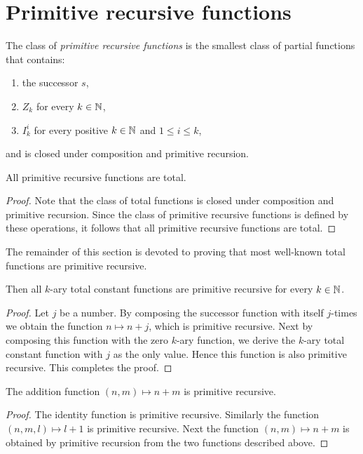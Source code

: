 \documentclass[10pt]{amsart}
\begin{document}
\section{Primitive recursive functions}

\begin{definition}
	The class of \textit{primitive recursive functions} is the smallest class of partial functions that contains:
	\begin{enumerate}[label=\textbf{(\arabic*)}, leftmargin=3.0em]
		\item the successor $s$,
		\item $Z_k$ for every $k \in {\mathbb N}$,
		\item $I^i_k$ for every positive $k \in {\mathbb N}$ and $1\leq i \leq k$,
	\end{enumerate}
	and is closed under composition and primitive recursion.
\end{definition}

\begin{proposition}\label{proposition:all_primitive_recursive_functions_are_total}
	All primitive recursive functions are total.
\end{proposition}
\begin{proof}
	Note that the class of total functions is closed under composition and primitive recursion. Since the class of primitive recursive functions  is defined by these operations, it follows that all primitive recursive functions  are total.
\end{proof}
\noindent
The remainder of this section is devoted to proving that most well-known total functions are primitive recursive.

\begin{proposition}\label{proposition:all_constant_functions_are_primitive_recursive}
	Then all $k$-ary total constant functions are primitive recursive  for every $k \in {\mathbb N}$.
\end{proposition}
\begin{proof}
	Let $j$ be a number. By composing the successor function with itself $j$-times we obtain the function $n \mapsto n + j$, which is primitive recursive. Next by composing this function with the zero $k$-ary function, we derive the $k$-ary total constant function with $j$ as the only value. Hence this function is also primitive recursive. This completes the proof.
\end{proof}

\begin{proposition}\label{proposition:addition_is_primitive_recursive}
	The addition function $(n,m) \mapsto n + m$ is primitive recursive.
\end{proposition}
\begin{proof}
	The identity function is primitive recursive. Similarly the function $(n,m,l) \mapsto l + 1$ is primitive recursive. Next the function $(n,m) \mapsto n + m$ is obtained by primitive recursion from the two functions described above.
\end{proof}
\end{document}
